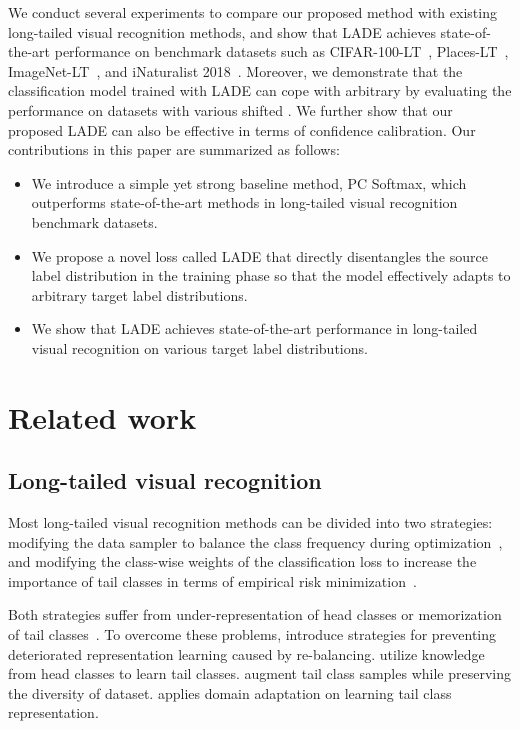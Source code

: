 \documentclass[final]{cvpr}
\begin{document}
We conduct several experiments to compare our proposed method with existing long-tailed visual recognition methods, and show that LADE achieves state-of-the-art performance on benchmark datasets such as CIFAR-100-LT~\cite{krizhevsky2009learning}, Places-LT~\cite{liu2019large}, ImageNet-LT~\cite{liu2019large}, and iNaturalist 2018~\cite{van2018inaturalist}.
Moreover, we demonstrate that the classification model trained with LADE can cope with arbitrary  by evaluating the performance on datasets with various shifted .
We further show that our proposed LADE can also be effective in terms of confidence calibration.
Our contributions in this paper are summarized as follows:
\begin{itemize}
    \item We introduce a simple yet strong baseline method, PC Softmax, which outperforms state-of-the-art methods in long-tailed visual recognition benchmark datasets.
    \item We propose a novel loss called LADE that directly disentangles the source label distribution in the training phase so that the model effectively adapts to arbitrary target label distributions.
    \item We show that LADE achieves state-of-the-art performance in long-tailed visual recognition on various target label distributions.
\end{itemize} \section{Related work}\label{sec:2_related_work}
\subsection{Long-tailed visual recognition}\label{subsec:2_1_long_tailed_visual_recognition}
Most long-tailed visual recognition methods can be divided into two strategies: 
modifying the data sampler to balance the class frequency during optimization~\cite{buda2018systematic,he2009learning,japkowicz2002class,byrd2019effect,shen2016relay}, and modifying the class-wise weights of the classification loss to increase the importance of tail classes in terms of empirical risk minimization~\cite{akbani2004applying,zhou2005training,liu2006influence,margineantu2000does,japkowicz2002class,he2009learning,buda2018systematic}.

Both strategies suffer from under-representation of head classes or memorization of tail classes~\cite{yang2020rethinking,cao2019learning}. 
To overcome these problems, \cite{huang2016learning,kang2019decoupling,cao2019learning,zhou2020bbn} introduce strategies for preventing deteriorated representation learning caused by re-balancing.
\cite{wang2017learning,liu2019large} utilize knowledge from head classes to learn tail classes.
\cite{kim2020m2m,wang2020deep} augment tail class samples while preserving the diversity of dataset.
\cite{jamal2020rethinking} applies domain adaptation on learning tail class representation. 
\end{document}
